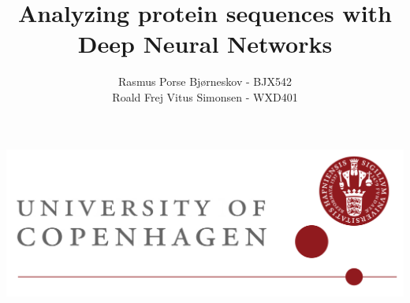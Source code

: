 \documentclass[10pt,a4paper]{article} %
\author{Rasmus Porse Bjørneskov - BJX542\\Roald Frej Vitus Simonsen - WXD401}
\title{Analyzing protein sequences with Deep Neural Networks}
\begin{document}
\maketitle
\begin{center}
\includegraphics[width=0.6\linewidth]{images/ku_logo_uk_h}
\end{center}

\newpage
\setcounter{tocdepth}{2}
\tableofcontents
\newpage
\begin{multicols}{2}




\end{multicols}
\newpage
\nocite{*}
 

\newpage

\end{document}
